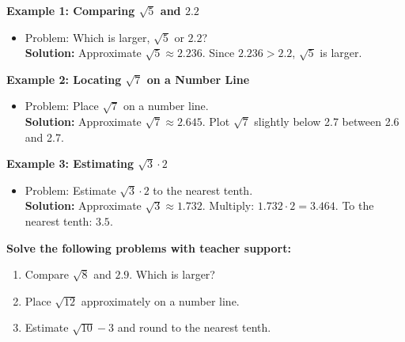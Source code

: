 \documentclass[12pt]{article}
\begin{document}
\begin{tcolorbox}[colframe=black!60, colback=white, 
coltitle=black, colbacktitle=black!15, fonttitle=\bfseries\Large, 
title=Examples, halign title=center, left=10pt, right=10pt, top=10pt, bottom=15pt]
\textbf{Example 1: Comparing \( \sqrt{5} \) and \( 2.2 \)}
\begin{itemize}
    \item Problem: Which is larger, \( \sqrt{5} \) or \( 2.2 \)?\\
    \textbf{Solution:} Approximate \( \sqrt{5} \approx 2.236 \). Since \( 2.236 > 2.2 \), \( \sqrt{5} \) is larger.
\end{itemize}

\textbf{Example 2: Locating \( \sqrt{7} \) on a Number Line}
\begin{itemize}
    \item Problem: Place \( \sqrt{7} \) on a number line.\\
    \textbf{Solution:} Approximate \( \sqrt{7} \approx 2.645 \). Plot \( \sqrt{7} \) slightly below 2.7 between 2.6 and 2.7.
\end{itemize}

\textbf{Example 3: Estimating \( \sqrt{3} \cdot 2 \)}
\begin{itemize}
    \item Problem: Estimate \( \sqrt{3} \cdot 2 \) to the nearest tenth.\\
    \textbf{Solution:} Approximate \( \sqrt{3} \approx 1.732 \). Multiply: \( 1.732 \cdot 2 = 3.464 \). To the nearest tenth: \( 3.5 \).
\end{itemize}
\end{tcolorbox}

\begin{tcolorbox}[colframe=black!60, colback=white, 
coltitle=black, colbacktitle=black!15, fonttitle=\bfseries\Large, 
title=Guided Practice, halign title=center, left=10pt, right=10pt, top=10pt, bottom=15pt]
\textbf{Solve the following problems with teacher support:}
\begin{enumerate}[itemsep=3em]
    \item Compare \( \sqrt{8} \) and \( 2.9 \). Which is larger?
    \item Place \( \sqrt{12} \) approximately on a number line.
    \item Estimate \( \sqrt{10} - 3 \) and round to the nearest tenth.
\end{enumerate}
\end{tcolorbox}
\end{document}
